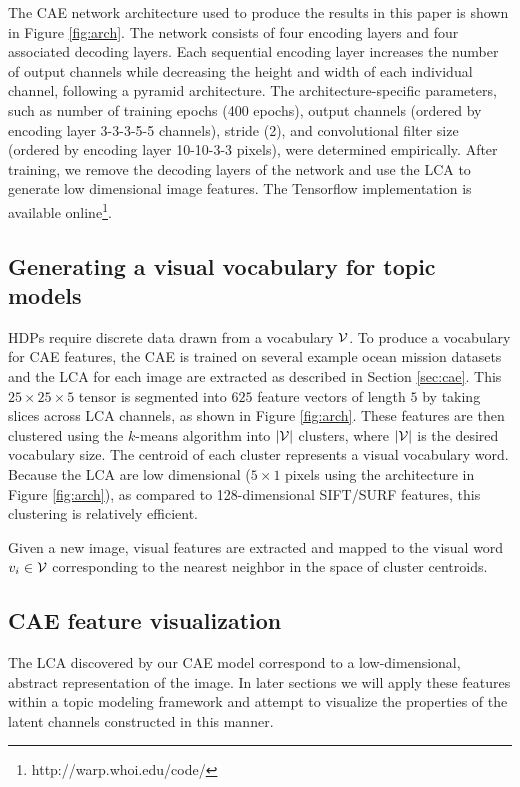 \documentclass[letterpaper, 10 pt, conference]{ieeeconf}
\begin{document}
The CAE network architecture used to produce the results in this paper is shown in Figure \ref{fig:arch}. The network consists of four encoding layers and four associated decoding layers.  Each sequential encoding layer increases the number of output channels while decreasing the height and width of each individual channel, following a pyramid architecture. The architecture-specific parameters, such as number of training epochs (400 epochs), output channels (ordered by encoding layer 3-3-3-5-5 channels), stride (2), and convolutional filter size (ordered by encoding layer 10-10-3-3 pixels), were determined empirically.  After training, we remove the decoding layers of the network and use the LCA to generate low dimensional image features.  The Tensorflow \cite{Abadi} implementation is available online\footnote{ http://warp.whoi.edu/code/}.

\subsection{Generating a visual vocabulary for topic models}
HDPs require discrete data drawn from a vocabulary $\cal V$. To produce a vocabulary for CAE features, the CAE is trained on several example ocean mission datasets and the LCA for each image are extracted as described in Section \ref{sec:cae}. This $25 \times 25 \times 5$ tensor is segmented into $625$ feature vectors of length $5$ by taking slices across LCA channels, as shown in Figure \ref{fig:arch}. These features are then clustered using the $k$-means algorithm into $|\cal V|$ clusters, where $|\cal V|$ is the desired vocabulary size. The centroid of each cluster represents a visual vocabulary word. Because the LCA are low dimensional ($ 5 \times 1$ pixels using the architecture in Figure \ref{fig:arch}), as compared to 128-dimensional SIFT/SURF features, this clustering is relatively efficient.

Given a new image, visual features are extracted and mapped to the visual word $v_i \in \cal V$ corresponding to the nearest neighbor in the space of cluster centroids.


\subsection{CAE feature visualization}
\label{sec:raw-cae}
The LCA discovered by our CAE model correspond to a low-dimensional, abstract representation of the image. In later sections we will apply these features within a topic modeling framework and attempt to visualize the properties of the latent channels constructed in this manner.
\end{document}
